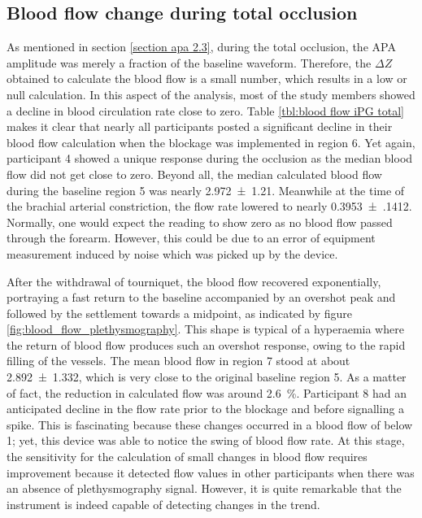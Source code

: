\subsection{Blood flow change during total occlusion}
\label{section apa 3.3}
As mentioned in section \ref{section apa 2.3}, during the total occlusion, the APA amplitude was merely a fraction of the baseline waveform.  Therefore, the $\Delta Z$ obtained to calculate the blood flow is a small number, which results in a low or null calculation. In this aspect of the analysis, most of the study members showed a decline in blood circulation rate close to zero.  Table \ref{tbl:blood flow iPG total} makes it clear that nearly all participants posted a significant decline in their blood flow calculation when the blockage was implemented in region 6. Yet again, participant 4 showed a unique response during the occlusion as the median blood flow did not get close to zero. Beyond all, the median calculated blood flow during the baseline region 5 was nearly \SI{2.972(1210)}{\bfv}. Meanwhile at the time of the brachial arterial constriction, the flow rate lowered to nearly \SI{0.3953(1412)}{\bfv}. Normally, one would expect the reading to show zero as no blood flow passed through the forearm. However, this could be due to an error of equipment measurement induced by noise which was picked up by the device. 

After the withdrawal of tourniquet, the blood flow recovered exponentially, portraying a fast return to the baseline accompanied by an overshot peak and followed by the settlement towards a midpoint, as indicated by figure \ref{fig:blood_flow_plethysmography}. This shape is typical of a hyperaemia where the return of blood flow produces such an overshot response, owing to the rapid filling of the vessels. The mean blood flow in region 7 stood at about \SI{2.892(1332)}{\bfv}, which is very close to the original baseline region 5. As a matter of fact, the reduction in calculated flow was around \SI{2.6}{\percent}. Participant 8 had an anticipated decline in the flow rate prior to the blockage and before signalling a spike. This is fascinating because these changes occurred in a blood flow of below \SI{1}{\bfv}; yet, this device was able to notice the swing of blood flow rate. At this stage, the sensitivity for the calculation of small changes in blood flow requires improvement because it detected flow values in other participants when there was an absence of plethysmography signal. However, it is quite remarkable that the instrument is indeed capable of detecting changes in the trend.

